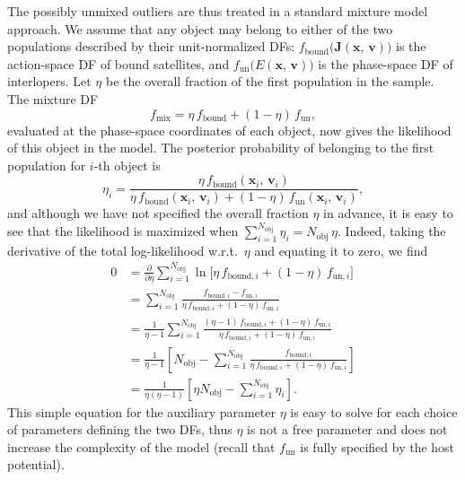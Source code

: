 \documentclass[usenatbib,fleqn]{mnras}
\begin{document}
The possibly unmixed outliers are thus treated in a standard mixture model approach. We assume that any object may belong to either of the two populations described by their unit-normalized DFs: $f_\text{bound}\big(\boldsymbol J(\boldsymbol x,\,\boldsymbol v) \big)$ is the action-space DF of bound satellites, and $f_\text{un}\big(E(\boldsymbol x,\,\boldsymbol v)\big)$ is the phase-space DF of interlopers. Let $\eta$ be the overall fraction of the first population in the sample. The mixture DF 
\begin{equation}  \label{eq:df_mixture}
f_\text{mix} = \eta\, f_\text{bound} + (1-\eta)\, f_\text{un},
\end{equation}
evaluated at the phase-space coordinates of each object, now gives the likelihood of this object in the model. The posterior probability of belonging to the first population for $i$-th object is 
\begin{equation}  \label{eq:posterior_outlier_probability}
\eta_i = \frac{\eta\, f_\text{bound}(\boldsymbol x_i,\,\boldsymbol v_i)}
{\eta\, f_\text{bound}(\boldsymbol x_i,\,\boldsymbol v_i) + (1-\eta)\, f_\text{un}(\boldsymbol x_i,\,\boldsymbol v_i)},
\end{equation}
and although we have not specified the overall fraction $\eta$ in advance, it is easy to see that the likelihood is maximized when $\sum_{i=1}^{N_\text{obj}} \eta_i = N_\text{obj}\, \eta$. Indeed, taking the derivative of the total log-likelihood w.r.t.\ $\eta$ and equating it to zero, we find
\begin{equation}
\begin{aligned}
0 &= \frac{\partial}{\partial \eta} \sum\nolimits_{i=1}^{N_\text{obj}} \ln \big[ \eta\, f_{\text{bound},i} + (1-\eta)\, f_{\text{un},i} \big] \\
&= \sum\nolimits_{i=1}^{N_\text{obj}}  \frac{f_{\text{bound},i} - f_{\text{un},i}}{\eta\, f_{\text{bound},i} + (1-\eta)\, f_{\text{un},i}} \\
&= \frac{1}{\eta-1} \sum\nolimits_{i=1}^{N_\text{obj}} \frac{(\eta-1)\,f_{\text{bound},i} + (1-\eta)\,f_{\text{un},i}}{\eta\, f_{\text{bound},i} + (1-\eta)\, f_{\text{un},i}} \\
&= \frac{1}{\eta-1} \left[ N_\text{obj} - \sum\nolimits_{i=1}^{N_\text{obj}} \frac{f_{\text{bound},i}}{\eta\, f_{\text{bound},i} + (1-\eta)\, f_{\text{un},i}} \right] \\
&= \frac{1}{\eta(\eta-1)} \left[ \eta N_\text{obj} - \sum\nolimits_{i=1}^{N_\text{obj}} \eta_i \right].
\end{aligned}
\end{equation}
This simple equation for the auxiliary parameter $\eta$ is easy to solve for each choice of parameters defining the two DFs, thus $\eta$ is not a free parameter and does not increase the complexity of the model (recall that $f_\text{un}$ is fully specified by the host potential).
\end{document}

